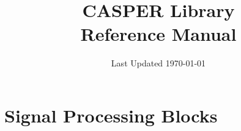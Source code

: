 \documentclass{report}
\title{\textbf{CASPER Library} \\Reference Manual}
\date{Last Updated \today}
\begin{document}
\maketitle
\tableofcontents


%
\chapter{Signal Processing Blocks}

\newpage

\newpage

\newpage

\newpage

\newpage

\newpage

\newpage

\newpage

\newpage

\newpage

\newpage

\newpage

\newpage

\newpage

\newpage

\newpage

\newpage

\newpage

\newpage

\newpage

\newpage

\newpage

\newpage

\newpage

\newpage

\newpage

\newpage

\newpage

\newpage

\newpage

\newpage

\newpage

\newpage

\newpage

\newpage

\newpage

\newpage

\newpage

\newpage

\newpage

\newpage

\newpage

\newpage

\newpage

\newpage

\newpage

\newpage

\newpage

\newpage
 
\end{document}
